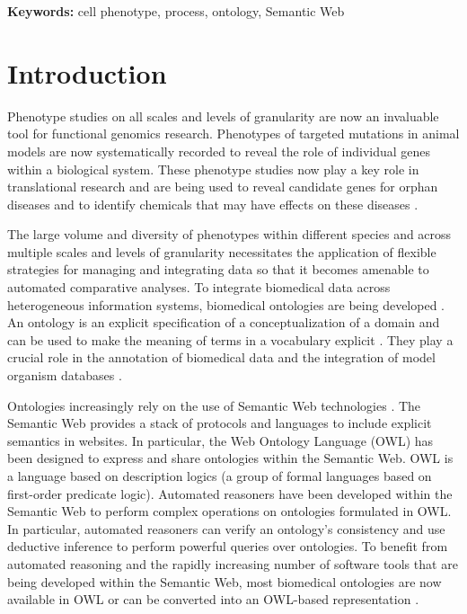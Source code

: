 \documentclass[12pt]{article}
\renewcommand{\cite}{\citep}
\begin{document}
{\bf Keywords:} cell phenotype, process, ontology, Semantic Web

\section{Introduction}
Phenotype studies on all scales and levels of granularity are now an
invaluable tool for functional genomics research. Phenotypes of
targeted mutations in animal models are now systematically recorded to
reveal the role of individual genes within a biological system. These
phenotype studies now play a key role in translational research and
are being used to reveal candidate genes for orphan diseases and to
identify chemicals that may have effects on these diseases
\cite{Schofield2011}.

The large volume and diversity of phenotypes within different species
and across multiple scales and levels of granularity necessitates the
application of flexible strategies for managing and integrating data
so that it becomes amenable to automated comparative analyses. To
integrate biomedical data across heterogeneous information systems,
biomedical ontologies are being developed \cite{Smith2007}. An
ontology is an explicit specification of a conceptualization of a
domain and can be used to make the meaning of terms in a vocabulary
explicit \cite{Gruber1995, Guarino1998}. They play a crucial role in
the annotation of biomedical data and the integration of model
organism databases \cite{go2010, Bada2004, goble}.

Ontologies increasingly rely on the use of Semantic Web technologies
\cite{Berners-Lee2001}. The Semantic Web provides a stack of protocols
and languages to include explicit semantics in websites. In
particular, the Web Ontology Language (OWL) \cite{Grau2008} has been
designed to express and share ontologies within the Semantic Web. OWL
is a language based on description logics (a group of formal languages
based on first-order predicate logic). Automated reasoners have been
developed within the Semantic Web to perform complex operations on
ontologies formulated in OWL. In particular, automated reasoners can
verify an ontology's consistency and use deductive inference to
perform powerful queries over ontologies. To benefit from automated
reasoning and the rapidly increasing number of software tools that are
being developed within the Semantic Web, most biomedical ontologies
are now available in OWL or can be converted into an OWL-based
representation \cite{Horrocks2007, Hoehndorf2010patterns}.
\end{document}
